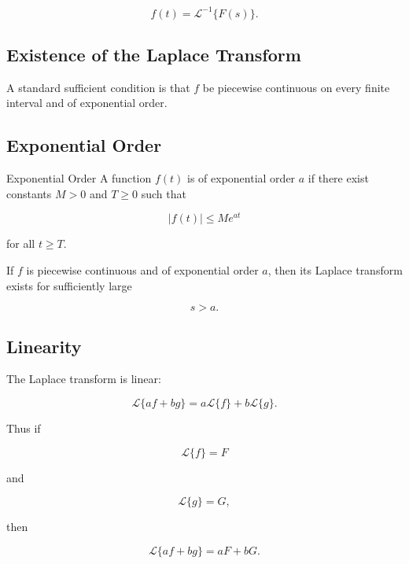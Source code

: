 \[
\boxed{
f(t)
=
\mathcal{L}^{-1}\{F(s)\}.
}
\]

\subsection{Existence of the Laplace Transform}
\label{subsec:laplace-existence}

A standard sufficient condition is that \(f\) be piecewise continuous on
every finite interval and of exponential order.

\subsection{Exponential Order}
\label{subsec:exponential-order}

\begin{definitionbox}{Exponential Order}
A function \(f(t)\) is of exponential order \(a\) if there exist
constants \(M>0\) and \(T\geq0\) such that

\[
\boxed{
|f(t)|
\leq
Me^{at}
}
\]

for all \(t\geq T\).
\end{definitionbox}

If \(f\) is piecewise continuous and of exponential order \(a\), then its
Laplace transform exists for sufficiently large

\[
\boxed{
s>a.
}
\]

\subsection{Linearity}
\label{subsec:laplace-linearity}

The Laplace transform is linear:

\[
\boxed{
\mathcal{L}
\{
af+bg
\}
=
a\mathcal{L}\{f\}
+
b\mathcal{L}\{g\}.
}
\]

Thus if

\[
\mathcal{L}\{f\}=F
\]

and

\[
\mathcal{L}\{g\}=G,
\]

then

\[
\boxed{
\mathcal{L}
\{
af+bg
\}
=
aF+bG.
}
\]

